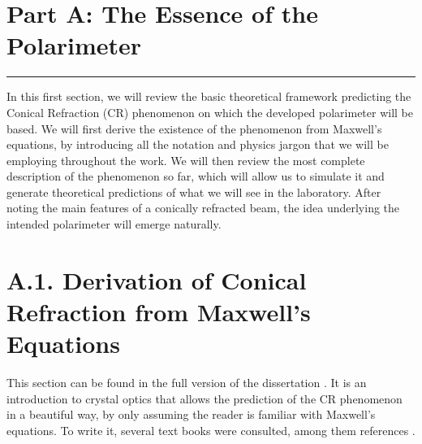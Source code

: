 \documentclass[11pt, a4paper, twoside]{article} %
\begin{document}
\newpage

\newpage


\newpage
\clearpage
\newpage

\section*{\centering \huge{Part A: The Essence of the Polarimeter}\vspace{-0.4cm}}
\noindent\rule{\textwidth}{0.4pt}
\vspace{-0.4cm}

In this first section, we will review the basic theoretical framework predicting the Conical Refraction (CR) phenomenon on which the developed polarimeter will be based. We will first derive the existence of the phenomenon from Maxwell's equations, by introducing all the notation and physics jargon that we will be employing throughout the work. We will then review the most complete description of the phenomenon so far, which will allow us to simulate it and generate theoretical predictions of what we will see in the laboratory. After noting the main features of a conically refracted beam, the idea underlying the intended polarimeter will emerge naturally.\vspace{-0.2cm}

\section*{A.1. Derivation of Conical Refraction from Maxwell's Equations\vspace{-0.2cm}}
This section can be found in the full version of the dissertation \cite{full}. It is an introduction to crystal optics that allows the prediction of the CR phenomenon in a beautiful way, by only assuming the reader is familiar with Maxwell's equations. To write it, several text books were consulted, among them references \cite{LL,magnetostatic,fundamentals}.
\end{document}
